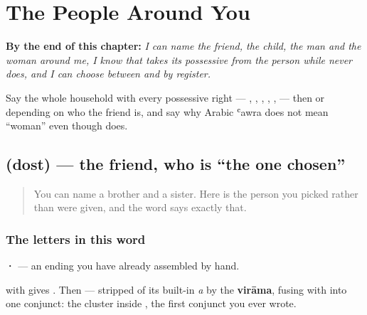 
\chapter{The People Around You}
\label{ch:hi-people-around-you}

\begin{chapteropening}
\textbf{By the end of this chapter:} \emph{I can name the friend, the child, the man and the woman around me, I know that  takes its possessive from the person while  never does, and I can choose between  and  by register.}

Say the whole household with every possessive right —  ,  ,  ,  ,  ,   — then   or   depending on who the friend is, and say why Arabic ʿawra does not mean “woman” even though  does.
\end{chapteropening}

\section[\texorpdfstring{\hi{दोस्त} (dost)}{दोस्त (dost)}]{ (dost) — the friend, who is \textquotedblleft{}the one chosen\textquotedblright{}}

\label{lesson:HI-C39-dost}



\begin{quote}
You can name a brother and a sister. Here is the person you picked rather than were given, and the word says exactly that.
\end{quote}

\subsection*{The letters in this word}
\textbf{·} — an ending you have already assembled by hand.

\textbf{} with \textbf{} gives \textbf{}. Then \textbf{} — \textbf{} stripped of its built-in \emph{a} by the \textbf{virāma}, fusing with \textbf{} into one conjunct: the cluster inside \textbf{}, the first conjunct you ever wrote.

